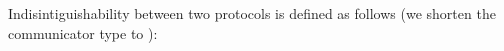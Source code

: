 %
%
%

Indisintiguishability between two protocols is defined as follows (we shorten the communicator type  to ):

